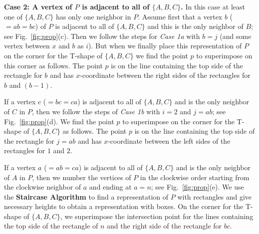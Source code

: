 \documentclass{llncs}
\begin{document}
	


	\noindent
	\textbf{Case 2: A vertex of $P$ is adjacent to all of $\{A,B,C\}$.} In this case at
	least one of $\{A,B,C\}$ has only one neighbor in $P$. Assume first that a vertex $b$
	($=ab=bc$) of $P$ is adjacent to all of $\{A,B,C\}$ and this is the only neighbor of $B$;
	see Fig.~\ref{fig:prop}(c).
 Then we follow the steps for \textit{Case 1a}
	with $b=j$ (and some vertex between $x$ and $b$ as $i$). But when we finally
	place this representation of $P$ on the corner for the T-shape of $\{A,B,C\}$ we find
	the point $p$ to superimpose on this corner as follows. The point $p$ is on the line
	containing the top side of the rectangle for $b$ and has $x$-coordinate between the
	right sides of the rectangles for $b$ and $(b-1)$.

	If a vertex $c$ ($=bc=ca$) is adjacent to all of $\{A,B,C\}$ and is
	the only neighbor of $C$ in $P$, then we follow the steps of \textit{Case 1b} with $i=2$
	and $j=ab$; see Fig.~\ref{fig:prop}(d).
 We find the point $p$ to superimpose on
	the corner for the T-shape of $\{A,B,C\}$ as follows. The point $p$ is on the line
	containing the top side of the rectangle for $j=ab$ and has $x$-coordinate between
	the left sides of the rectangles for $1$ and $2$.

	If a vertex $a$ ($=ab=ca$) is adjacent to all of $\{A,B,C\}$ and is
	the only neighbor of $A$ in $P$, then we number the vertices of $P$ in the clockwise
	order starting from the clockwise neighbor of $a$ and ending at $a=n$;
	see Fig.~\ref{fig:prop}(e).
	 We use the
	\textbf{Staircase Algorithm} to find a representation of $P$ with
	rectangles and give necessary heights to obtain a representation
	with boxes. On the corner for the T-shape of $\{A,B,C\}$, we superimpose the
	intersection point for the lines containing the top side of the rectangle of $n$ and the
	right side of the rectangle for $bc$.
\end{document}
